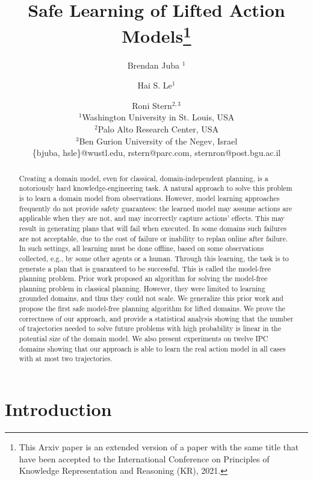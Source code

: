 \documentclass{article}
\title{Safe Learning of Lifted Action Models\footnote{This Arxiv paper is an extended version of a paper with the same title that have been accepted to the International Conference on Principles of Knowledge Representation and Reasoning (KR), 2021.}}
\author{%
Brendan Juba $^1$\and
Hai S. Le$^1$\and
Roni Stern$^{2,3}$\\
\affiliations
$^1$Washington University in St. Louis, USA\\
$^2$Palo Alto Research Center, USA\\
$^3$Ben Gurion University of the Negev, Israel\\

\emails
\{bjuba, hsle\}@wustl.edu,
rstern@parc.com,
sternron@post.bgu.ac.il
}
\begin{document}
\maketitle

\begin{abstract}
Creating a domain model, even for classical, domain-independent planning, is a notoriously hard knowledge-engineering task. 
A natural approach to solve this problem is to learn a domain model from observations. 
However, model learning approaches frequently do not provide safety guarantees: the learned model may assume actions are applicable when they are not, and may incorrectly capture actions' effects. 
This may result in generating plans that will fail when executed. 
In some domains such failures are not acceptable, due to the cost of failure or inability to replan online after failure. 
In such settings, all learning must be done offline, based on some observations collected, e.g., by some other agents or a human. Through this learning, the task is to generate a plan that is guaranteed to be successful. 
This is called the model-free planning problem. 
Prior work proposed an algorithm for solving the model-free planning problem in classical planning. 
However, they were limited to learning grounded domains, and thus they could not scale. 
We generalize this prior work and propose the first safe model-free planning algorithm for lifted domains. 
We prove the correctness of our approach, and provide a statistical analysis showing that the number of trajectories needed to solve future problems with high probability is linear in the potential size of the domain model.
We also present experiments on twelve IPC domains showing that our approach is able to learn the real action model in all cases with at most two trajectories. 

\end{abstract}

\section{Introduction}
\end{document}
